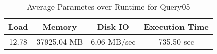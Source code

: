 \documentclass[../../main.tex]{subfiles}
\begin{document}
    \begin{table}
        \begin{center}
            \begin{tabular}{ |c|c|c|c| } 
            \hline
            Load & Memory & Disk IO & Execution Time\\
            \hline
            12.78 & 37925.04 MB & 6.06 MB/sec & 735.50 sec \\
            \hline
            \end{tabular}
            \\[1pt]
            \caption{Average Parametes over Runtime for Query05}
        \end{center}
    \end{table}
    \pagebreak
\end{document}
